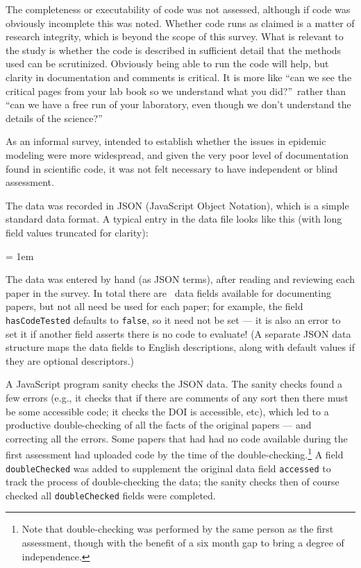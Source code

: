 \documentclass[10pt,a4paper]{article}
\begin{document}
The completeness or executability of code was not assessed, although if code was obviously incomplete this was noted. Whether code runs as claimed is a matter of research integrity, which is beyond the scope of this survey. What is relevant to the study is whether the code is described in sufficient detail that the methods used can be scrutinized. Obviously being able to run the code will help, but clarity in documentation and comments is critical. It is more like ``can we see the critical pages from your lab book so we understand what you did?''\ rather than ``can we have a free run of your laboratory, even though we don't understand the details of the science?''

As an informal survey, intended to establish whether the issues in epidemic modeling were more widespread, and given the very poor level of documentation found in scientific code, it was not felt necessary to have independent or blind assessment.

The data was recorded in JSON (JavaScript Object Notation), which is a simple standard data format. A typical entry in the data file looks like this (with long field values truncated for clarity):

\newdimen \codeIndent
\codeIndent = 1em


The data was entered by hand (as JSON terms), after reading and reviewing each paper in the survey. In total there are \countFields\ data fields available for documenting papers, but not all need be used for each paper; for example, the field \texttt{hasCodeTested} defaults to \texttt{false}, so it need not be set --- it is also an error to set it if another field asserts there is no code to evaluate! (A separate JSON data structure maps the data fields to English descriptions, along with default values if they are optional descriptors.)

A JavaScript program sanity checks the JSON data. The sanity checks found a few errors (e.g., it checks that if there are comments of any sort then there must be some accessible code; it checks the DOI is accessible, etc), which led to a productive double-checking of all the facts of the original papers --- and correcting all the errors. Some papers that had had no code available during the first assessment had uploaded code by the time of the double-checking.\footnote{{Note that double-checking was performed by the same person as the first assessment, though with the benefit of a six month gap to bring a degree of independence}.} A field \texttt{doubleChecked} was added to supplement the original data field \texttt{accessed} to track the process of double-checking the data; the sanity checks then of course checked all \texttt{doubleChecked} fields were completed.
\end{document}
